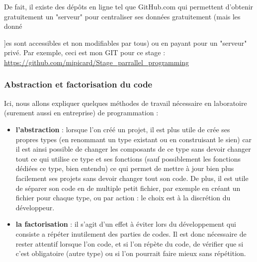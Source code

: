 \documentclass[a4paper,12pt]{article}
\begin{document}
{	De fait, il existe des d\'e{}p\^ots en ligne tel que GitHub.com qui permettent d'obtenir gratuitement un "serveur" pour centraliser ses donn\'e{}es gratuitement (mais les donn\'e{]es sont accessibles et non modifiables par tous) ou en payant pour un "serveur" privé.
	Par exemple, ceci est mon GIT pour ce stage : \url{https://github.com/mipicard/Stage_parrallel_programming}
	\subsubsection{Abstraction et factorisation du code}
	\indent Ici, nous allons expliquer quelques m\'e{}thodes de travail n\'e{}cessaire en laboratoire (surement aussi en entreprise) de programmation :
	\begin{itemize}
		\item \textbf{l'abstraction} : lorsque l'on cr\'e{}\'e un projet, il est plus utile de cr\'e{}e ses propres types (en renommant un type existant ou en construisant le sien) car il est ainsi possible de changer les composants de ce type sans devoir changer tout ce qui utilise ce type et ses fonctions (sauf possiblement les fonctions d\'e{}di\'e{}es ce type, bien entendu) ce qui permet de mettre \`a jour bien plus facilement ses projets sans devoir changer tout son code. De plus, il est utile de s\'e{}parer son code en de multiple petit fichier, par exemple en cr\'e{}ant un fichier pour chaque type, ou par action : le choix est \`a la discr\'e{}tion du d\'e{}veloppeur.
		\item \textbf{la factorisation} : il s'agit d'un effet \`a \'e{}viter lors du d\'e{}veloppement qui consiste a r\'e{}p\'e{}ter inutilement des parties de codes. Il est donc n\'e{}cessaire de rester attentif lorsque l'on code, et si l'on r\'e{}p\`ete du code, de v\'e{}rifier que si c'est obligatoire (autre type) ou si l'on pourrait faire mieux sans r\'e{}p\'e{}tition.
	\end{itemize}
}}
\end{document}
